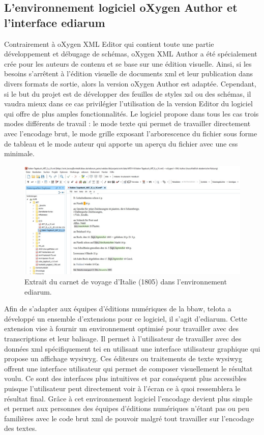 \documentclass[a4paper, 12pt, twoside]{book}
\begin{document}
\subsection{L'environnement logiciel oXygen Author et l'interface ediarum}
Contrairement à oXygen XML Editor qui contient toute une partie développement et débugage de schémas, oXygen XML Author a été spécialement crée pour les auteurs de contenu et se base sur une édition visuelle. Ainsi, si les besoins s'arrêtent à l'édition visuelle de documents \gls{xml} et leur publication dans divers formats de sortie, alors la version oXygen Author est adaptée. Cependant, si le but du projet est de développer des feuilles de styles \gls{xsl} ou des schémas, il vaudra mieux dans ce cas privilégier l'utilisation de la version Editor du logiciel qui offre de plus amples fonctionnalités. Le logiciel propose dans tous les cas trois modes différents de travail : le mode texte qui permet de travailler directement avec l'encodage brut, le mode grille exposant l'arborescence du fichier sous forme de tableau et le mode auteur qui apporte un aperçu du fichier avec une \gls{css} minimale. 
\begin{figure}[ht]
    \centering
    \includegraphics[scale=0.7]{img/ediarum_umgebung.png}
    \caption{Extrait du carnet de voyage d'Italie (1805) dans l'environnement ediarum.}
    \hfill
\end{figure}

Afin de s'adapter aux équipes d'éditions numériques de la \gls{bbaw}, \gls{telota} a développé un ensemble d'extensions pour ce logiciel, il s'agit d'ediarum. Cette extension vise à fournir un environnement optimisé pour travailler avec des transcriptions et leur balisage. Il permet à l'utilisateur de travailler avec des données \gls{xml} spécifiquement \gls{tei} en utilisant une interface utilisateur graphique qui propose un affichage \gls{wysiwyg}. Ces éditeurs ou traitements de texte \gls{wysiwyg} offrent une interface utilisateur qui permet de composer visuellement le résultat voulu. Ce sont des interfaces plus intuitives et par conséquent plus accessibles puisque l'utilisateur peut directement voir à l'écran ce à quoi ressemblera le résultat final. Grâce à cet environnement logiciel l'encodage devient plus simple et permet aux personnes des équipes d'éditions numériques n'étant pas ou peu familières avec le code brut \gls{xml} de pouvoir malgré tout travailler sur l'encodage des textes. 
\end{document}

